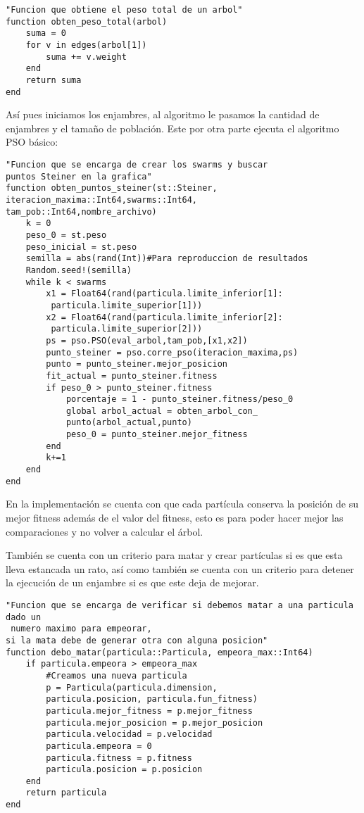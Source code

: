 \documentclass[11pt,letterpaper]{article}
\begin{document}
\begin{lstlisting}
"Funcion que obtiene el peso total de un arbol"
function obten_peso_total(arbol)
	suma = 0
	for v in edges(arbol[1])
		suma += v.weight
	end
	return suma
end
\end{lstlisting}

Así pues iniciamos los enjambres, al algoritmo le pasamos la cantidad de enjambres y el tamaño de población. Este por otra parte ejecuta el algoritmo PSO básico:

\begin{lstlisting}
"Funcion que se encarga de crear los swarms y buscar
puntos Steiner en la grafica"
function obten_puntos_steiner(st::Steiner,
iteracion_maxima::Int64,swarms::Int64,
tam_pob::Int64,nombre_archivo)
	k = 0
	peso_0 = st.peso
	peso_inicial = st.peso
	semilla = abs(rand(Int))#Para reproduccion de resultados
	Random.seed!(semilla)
	while k < swarms
		x1 = Float64(rand(particula.limite_inferior[1]:
		 particula.limite_superior[1]))
		x2 = Float64(rand(particula.limite_inferior[2]:
		 particula.limite_superior[2]))
		ps = pso.PSO(eval_arbol,tam_pob,[x1,x2])
		punto_steiner = pso.corre_pso(iteracion_maxima,ps)
		punto = punto_steiner.mejor_posicion
		fit_actual = punto_steiner.fitness
		if peso_0 > punto_steiner.fitness
			porcentaje = 1 - punto_steiner.fitness/peso_0
			global arbol_actual = obten_arbol_con_
			punto(arbol_actual,punto)
			peso_0 = punto_steiner.mejor_fitness
		end
		k+=1
	end
end
\end{lstlisting}

En la implementación se cuenta con que cada partícula conserva la posición de su mejor fitness además de el valor del fitness, esto es para poder hacer mejor las comparaciones y no volver a calcular el árbol.

También se cuenta con un criterio para matar y crear partículas si es que esta lleva estancada un rato, así como también se cuenta con un criterio para detener la ejecución de un enjambre si es que este deja de mejorar.

\begin{lstlisting}
"Funcion que se encarga de verificar si debemos matar a una particula dado un
 numero maximo para empeorar,
si la mata debe de generar otra con alguna posicion"
function debo_matar(particula::Particula, empeora_max::Int64)
	if particula.empeora > empeora_max
		#Creamos una nueva particula
		p = Particula(particula.dimension, 
		particula.posicion, particula.fun_fitness)
		particula.mejor_fitness = p.mejor_fitness
		particula.mejor_posicion = p.mejor_posicion
		particula.velocidad = p.velocidad
		particula.empeora = 0
		particula.fitness = p.fitness
		particula.posicion = p.posicion
	end
	return particula
end
\end{lstlisting}
\end{document}
